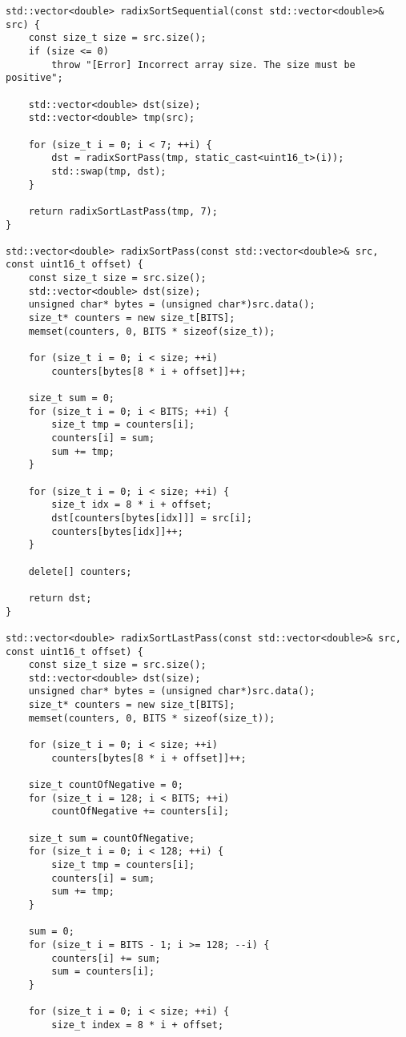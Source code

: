 \documentclass{report}
\begin{document}
\begin{lstlisting}
std::vector<double> radixSortSequential(const std::vector<double>& src) {
    const size_t size = src.size();
    if (size <= 0)
        throw "[Error] Incorrect array size. The size must be positive";

    std::vector<double> dst(size);
    std::vector<double> tmp(src);

    for (size_t i = 0; i < 7; ++i) {
        dst = radixSortPass(tmp, static_cast<uint16_t>(i));
        std::swap(tmp, dst);
    }

    return radixSortLastPass(tmp, 7);
}

std::vector<double> radixSortPass(const std::vector<double>& src, const uint16_t offset) {
    const size_t size = src.size();
    std::vector<double> dst(size);
    unsigned char* bytes = (unsigned char*)src.data();
    size_t* counters = new size_t[BITS];
    memset(counters, 0, BITS * sizeof(size_t));

    for (size_t i = 0; i < size; ++i)
        counters[bytes[8 * i + offset]]++;

    size_t sum = 0;
    for (size_t i = 0; i < BITS; ++i) {
        size_t tmp = counters[i];
        counters[i] = sum;
        sum += tmp;
    }

    for (size_t i = 0; i < size; ++i) {
        size_t idx = 8 * i + offset;
        dst[counters[bytes[idx]]] = src[i];
        counters[bytes[idx]]++;
    }

    delete[] counters;

    return dst;
}

std::vector<double> radixSortLastPass(const std::vector<double>& src, const uint16_t offset) {
    const size_t size = src.size();
    std::vector<double> dst(size);
    unsigned char* bytes = (unsigned char*)src.data();
    size_t* counters = new size_t[BITS];
    memset(counters, 0, BITS * sizeof(size_t));

    for (size_t i = 0; i < size; ++i)
        counters[bytes[8 * i + offset]]++;

    size_t countOfNegative = 0;
    for (size_t i = 128; i < BITS; ++i)
        countOfNegative += counters[i];

    size_t sum = countOfNegative;
    for (size_t i = 0; i < 128; ++i) {
        size_t tmp = counters[i];
        counters[i] = sum;
        sum += tmp;
    }

    sum = 0;
    for (size_t i = BITS - 1; i >= 128; --i) {
        counters[i] += sum;
        sum = counters[i];
    }

    for (size_t i = 0; i < size; ++i) {
        size_t index = 8 * i + offset;


\end{lstlisting}
\end{document}
